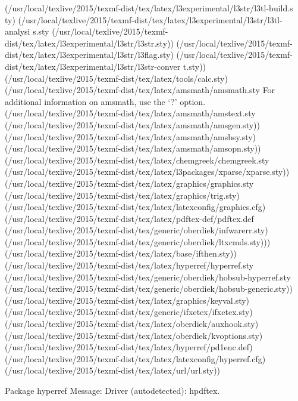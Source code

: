(/usr/local/texlive/2015/texmf-dist/tex/latex/l3experimental/l3str/l3tl-build.s
ty)
(/usr/local/texlive/2015/texmf-dist/tex/latex/l3experimental/l3str/l3tl-analysi
s.sty
(/usr/local/texlive/2015/texmf-dist/tex/latex/l3experimental/l3str/l3str.sty))
(/usr/local/texlive/2015/texmf-dist/tex/latex/l3experimental/l3str/l3flag.sty)
(/usr/local/texlive/2015/texmf-dist/tex/latex/l3experimental/l3str/l3str-conver
t.sty)) (/usr/local/texlive/2015/texmf-dist/tex/latex/tools/calc.sty)
(/usr/local/texlive/2015/texmf-dist/tex/latex/amsmath/amsmath.sty
For additional information on amsmath, use the `?' option.
(/usr/local/texlive/2015/texmf-dist/tex/latex/amsmath/amstext.sty
(/usr/local/texlive/2015/texmf-dist/tex/latex/amsmath/amsgen.sty))
(/usr/local/texlive/2015/texmf-dist/tex/latex/amsmath/amsbsy.sty)
(/usr/local/texlive/2015/texmf-dist/tex/latex/amsmath/amsopn.sty))
(/usr/local/texlive/2015/texmf-dist/tex/latex/chemgreek/chemgreek.sty
(/usr/local/texlive/2015/texmf-dist/tex/latex/l3packages/xparse/xparse.sty))
(/usr/local/texlive/2015/texmf-dist/tex/latex/graphics/graphics.sty
(/usr/local/texlive/2015/texmf-dist/tex/latex/graphics/trig.sty)
(/usr/local/texlive/2015/texmf-dist/tex/latex/latexconfig/graphics.cfg)
(/usr/local/texlive/2015/texmf-dist/tex/latex/pdftex-def/pdftex.def
(/usr/local/texlive/2015/texmf-dist/tex/generic/oberdiek/infwarerr.sty)
(/usr/local/texlive/2015/texmf-dist/tex/generic/oberdiek/ltxcmds.sty)))
(/usr/local/texlive/2015/texmf-dist/tex/latex/base/ifthen.sty))
(/usr/local/texlive/2015/texmf-dist/tex/latex/hyperref/hyperref.sty
(/usr/local/texlive/2015/texmf-dist/tex/generic/oberdiek/hobsub-hyperref.sty
(/usr/local/texlive/2015/texmf-dist/tex/generic/oberdiek/hobsub-generic.sty))
(/usr/local/texlive/2015/texmf-dist/tex/latex/graphics/keyval.sty)
(/usr/local/texlive/2015/texmf-dist/tex/generic/ifxetex/ifxetex.sty)
(/usr/local/texlive/2015/texmf-dist/tex/latex/oberdiek/auxhook.sty)
(/usr/local/texlive/2015/texmf-dist/tex/latex/oberdiek/kvoptions.sty)
(/usr/local/texlive/2015/texmf-dist/tex/latex/hyperref/pd1enc.def)
(/usr/local/texlive/2015/texmf-dist/tex/latex/latexconfig/hyperref.cfg)
(/usr/local/texlive/2015/texmf-dist/tex/latex/url/url.sty))

Package hyperref Message: Driver (autodetected): hpdftex.

